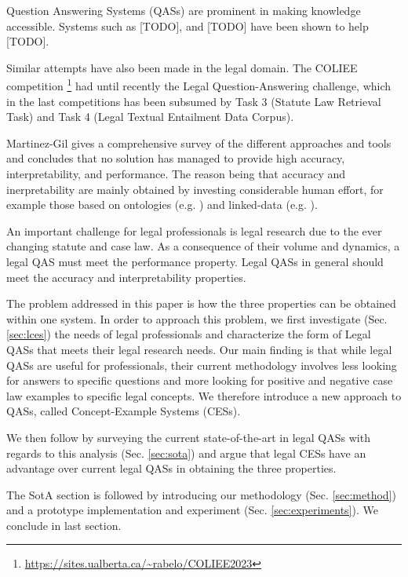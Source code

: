 Question Answering Systems (QASs) are prominent in making knowledge accessible. Systems such as [TODO], and [TODO] have been shown to help [TODO]. 


Similar attempts have also been made in the legal domain. The COLIEE competition \footnote{\url{https://sites.ualberta.ca/~rabelo/COLIEE2023}} had until recently the Legal Question-Answering challenge, which in the last competitions has been subsumed by Task 3 (Statute Law Retrieval Task) and Task 4 (Legal Textual Entailment Data Corpus). 

Martinez-Gil \cite{martinez2023survey} gives a comprehensive survey of the different approaches and tools and concludes that no solution has managed to provide high accuracy, interpretability, and performance. The reason being that accuracy and inerpretability are mainly obtained by investing considerable human effort, for example those based on ontologies (e.g. \cite{fawei2018methodology}) and linked-data (e.g. \cite{filtz2021linked}).

An important challenge for legal professionals is legal research \cite{sanderson2021practical} due to the ever changing statute and case law. As a consequence of their volume and dynamics, a legal QAS must meet the performance property. Legal QASs in general should meet the accuracy and interpretability properties. 

The problem addressed in this paper is how the three properties can be obtained within one system. In order to approach this problem, we first investigate (Sec. \ref{sec:lces}) the needs of legal professionals and characterize the form of Legal QASs that meets their legal research needs. Our main finding is that while legal QASs are useful for professionals, their current methodology involves less looking for answers to specific questions and more looking for positive and negative case law examples to specific legal concepts. We therefore introduce a new approach to QASs, called Concept-Example Systems (CESs). 

We then follow by surveying the current state-of-the-art in legal QASs with regards to this analysis (Sec. \ref{sec:sota}) and argue that legal CESs have an advantage over current legal QASs in obtaining the three properties.

The SotA section is followed by introducing our methodology (Sec. \ref{sec:method}) and a prototype implementation and experiment (Sec. \ref{sec:experiments}). We conclude in last section.